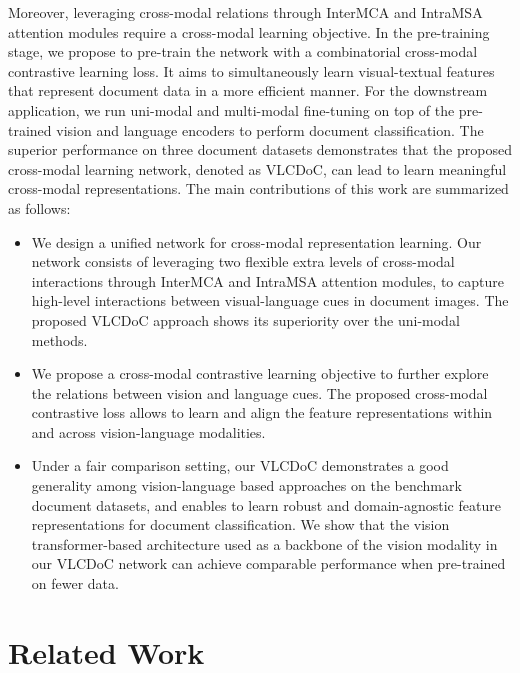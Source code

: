 \documentclass[preprint,review,12pt]{elsarticle}
\begin{document}
Moreover, leveraging cross-modal relations through InterMCA and IntraMSA attention modules require a cross-modal learning objective. In the pre-training stage, we propose to pre-train the network with a combinatorial cross-modal contrastive learning loss. It aims to simultaneously learn visual-textual features that represent document data in a more efficient manner. For the downstream application, we run uni-modal and multi-modal fine-tuning on top of the pre-trained vision and language encoders to perform document classification. The superior performance on three document datasets demonstrates that the proposed cross-modal learning network, denoted as VLCDoC, can lead to learn meaningful cross-modal representations. The main contributions of this work are summarized as follows:

\begin{itemize}
    \item We design a unified network for cross-modal representation learning. Our network consists of leveraging two flexible extra levels of cross-modal interactions through InterMCA and IntraMSA attention modules, to capture high-level interactions between visual-language cues in document images. The proposed VLCDoC approach shows its superiority over the uni-modal methods.
    \item We propose a cross-modal contrastive learning objective to further explore the relations between vision and language cues. The proposed cross-modal contrastive loss allows to learn and align the feature representations within and across vision-language modalities.
    \item Under a fair comparison setting, our VLCDoC demonstrates a good generality among vision-language based approaches on the benchmark document datasets, and enables to learn robust and domain-agnostic feature representations for document classification. We show that the vision transformer-based architecture used as a backbone of the vision modality in our VLCDoC network can achieve comparable performance when pre-trained on fewer data.
\end{itemize}

\section{Related Work}
\end{document}
